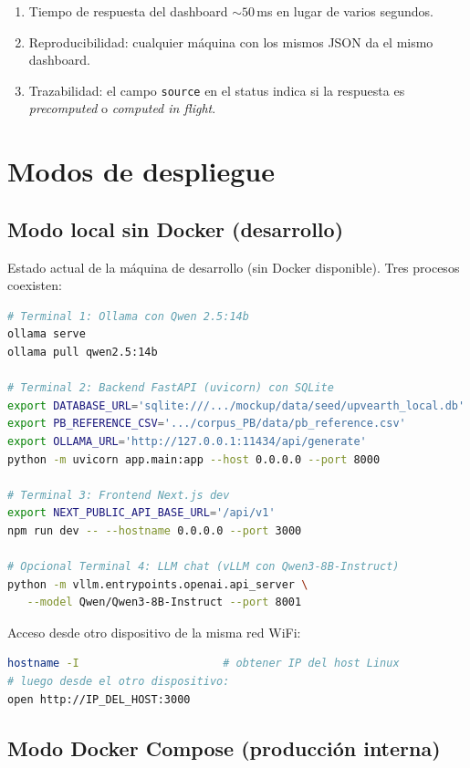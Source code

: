 \documentclass[11pt,a4paper]{article}
\begin{document}
\begin{enumerate}
\item Tiempo de respuesta del dashboard \(\sim 50\,\)ms en lugar de varios segundos.
\item Reproducibilidad: cualquier máquina con los mismos JSON da el mismo dashboard.
\item Trazabilidad: el campo \texttt{source} en el status indica si la respuesta es \emph{precomputed} o \emph{computed in flight}.
\end{enumerate}

\section{Modos de despliegue}

\subsection{Modo local sin Docker (desarrollo)}

Estado actual de la máquina de desarrollo (sin Docker disponible). Tres procesos coexisten:

\begin{lstlisting}[language=bash, caption={Arranque local}]
# Terminal 1: Ollama con Qwen 2.5:14b
ollama serve
ollama pull qwen2.5:14b

# Terminal 2: Backend FastAPI (uvicorn) con SQLite
export DATABASE_URL='sqlite:///.../mockup/data/seed/upvearth_local.db'
export PB_REFERENCE_CSV='.../corpus_PB/data/pb_reference.csv'
export OLLAMA_URL='http://127.0.0.1:11434/api/generate'
python -m uvicorn app.main:app --host 0.0.0.0 --port 8000

# Terminal 3: Frontend Next.js dev
export NEXT_PUBLIC_API_BASE_URL='/api/v1'
npm run dev -- --hostname 0.0.0.0 --port 3000

# Opcional Terminal 4: LLM chat (vLLM con Qwen3-8B-Instruct)
python -m vllm.entrypoints.openai.api_server \
   --model Qwen/Qwen3-8B-Instruct --port 8001
\end{lstlisting}

Acceso desde otro dispositivo de la misma red WiFi:
\begin{lstlisting}[language=bash]
hostname -I                      # obtener IP del host Linux
# luego desde el otro dispositivo:
open http://IP_DEL_HOST:3000
\end{lstlisting}

\subsection{Modo Docker Compose (producción interna)}
\end{document}
